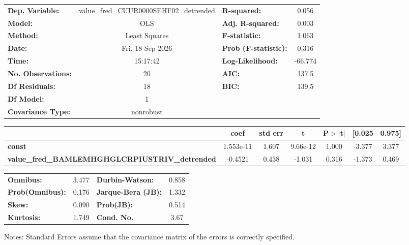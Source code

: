 \begin{center}
\begin{tabular}{lclc}
\toprule
\textbf{Dep. Variable:}                                & value\_fred\_CUUR0000SEHF02\_detrended & \textbf{  R-squared:         } &     0.056   \\
\textbf{Model:}                                        &                  OLS                   & \textbf{  Adj. R-squared:    } &     0.003   \\
\textbf{Method:}                                       &             Least Squares              & \textbf{  F-statistic:       } &     1.063   \\
\textbf{Date:}                                         &            Fri, 18 Sep 2026            & \textbf{  Prob (F-statistic):} &    0.316    \\
\textbf{Time:}                                         &                15:17:42                & \textbf{  Log-Likelihood:    } &   -66.774   \\
\textbf{No. Observations:}                             &                     20                 & \textbf{  AIC:               } &     137.5   \\
\textbf{Df Residuals:}                                 &                     18                 & \textbf{  BIC:               } &     139.5   \\
\textbf{Df Model:}                                     &                      1                 & \textbf{                     } &             \\
\textbf{Covariance Type:}                              &               nonrobust                & \textbf{                     } &             \\
\bottomrule
\end{tabular}
\begin{tabular}{lcccccc}
                                                       & \textbf{coef} & \textbf{std err} & \textbf{t} & \textbf{P$> |$t$|$} & \textbf{[0.025} & \textbf{0.975]}  \\
\midrule
\textbf{const}                                         &    1.553e-11  &        1.607     &  9.66e-12  &         1.000        &       -3.377    &        3.377     \\
\textbf{value\_fred\_BAMLEMHGHGLCRPIUSTRIV\_detrended} &      -0.4521  &        0.438     &    -1.031  &         0.316        &       -1.373    &        0.469     \\
\bottomrule
\end{tabular}
\begin{tabular}{lclc}
\textbf{Omnibus:}       &  3.477 & \textbf{  Durbin-Watson:     } &    0.858  \\
\textbf{Prob(Omnibus):} &  0.176 & \textbf{  Jarque-Bera (JB):  } &    1.332  \\
\textbf{Skew:}          &  0.090 & \textbf{  Prob(JB):          } &    0.514  \\
\textbf{Kurtosis:}      &  1.749 & \textbf{  Cond. No.          } &     3.67  \\
\bottomrule
\end{tabular}
\end{center}

Notes: \newline
 [1] Standard Errors assume that the covariance matrix of the errors is correctly specified.